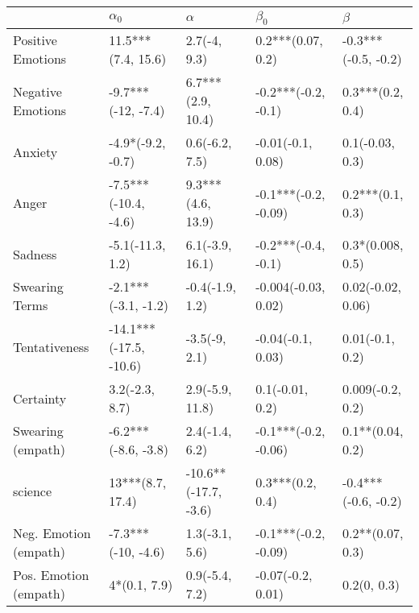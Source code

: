 \begin{tabular}{lllll}
\toprule
{} &              $\alpha_0$ &              $\alpha$ &             $\beta_0$ &              $\beta$ \\
\midrule
Positive Emotions     &      11.5***(7.4, 15.6) &          2.7(-4, 9.3) &     0.2***(0.07, 0.2) &  -0.3***(-0.5, -0.2) \\
Negative Emotions     &      -9.7***(-12, -7.4) &     6.7***(2.9, 10.4) &   -0.2***(-0.2, -0.1) &     0.3***(0.2, 0.4) \\
Anxiety               &       -4.9*(-9.2, -0.7) &        0.6(-6.2, 7.5) &     -0.01(-0.1, 0.08) &      0.1(-0.03, 0.3) \\
Anger                 &    -7.5***(-10.4, -4.6) &     9.3***(4.6, 13.9) &  -0.1***(-0.2, -0.09) &     0.2***(0.1, 0.3) \\
Sadness               &        -5.1(-11.3, 1.2) &       6.1(-3.9, 16.1) &   -0.2***(-0.4, -0.1) &     0.3*(0.008, 0.5) \\
Swearing Terms        &     -2.1***(-3.1, -1.2) &       -0.4(-1.9, 1.2) &   -0.004(-0.03, 0.02) &    0.02(-0.02, 0.06) \\
Tentativeness         &  -14.1***(-17.5, -10.6) &         -3.5(-9, 2.1) &     -0.04(-0.1, 0.03) &      0.01(-0.1, 0.2) \\
Certainty             &          3.2(-2.3, 8.7) &       2.9(-5.9, 11.8) &       0.1(-0.01, 0.2) &     0.009(-0.2, 0.2) \\
Swearing (empath)     &     -6.2***(-8.6, -3.8) &        2.4(-1.4, 6.2) &  -0.1***(-0.2, -0.06) &     0.1**(0.04, 0.2) \\
science               &        13***(8.7, 17.4) &  -10.6**(-17.7, -3.6) &      0.3***(0.2, 0.4) &  -0.4***(-0.6, -0.2) \\
Neg. Emotion (empath) &      -7.3***(-10, -4.6) &        1.3(-3.1, 5.6) &  -0.1***(-0.2, -0.09) &     0.2**(0.07, 0.3) \\
Pos. Emotion (empath) &            4*(0.1, 7.9) &        0.9(-5.4, 7.2) &     -0.07(-0.2, 0.01) &          0.2(0, 0.3) \\
\bottomrule
\end{tabular}
